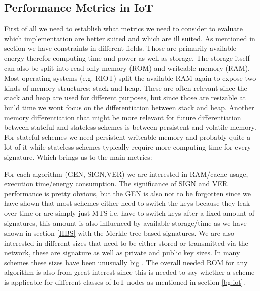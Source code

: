 \documentclass[conference]{IEEEtran}
\newcommand{\comment}[1]{}
\begin{document}
\subsection{Performance Metrics in IoT}
\comment{ %

'' small sized public key, small digital signature and a range of supported hash output sizes is recommended''\cite{QR_Iot_Lattice}

- „signature and/or key sizes to running times and memory consumption to energy consumption „
- „From the software benchmark perspec- tive, the runtime of key generation, signing, and verification processes whereas from the hardware perspective, CPU cycles, key size, signature size, and energy consumption are among the targeted evaluation metrics. In general, the parameter sets are highly dependent on the underlying construction of a particular scheme.“ \cite{QR_sigs}

} %

First of all we need to establish what metrics we need to consider to evaluate which implementation are better suited and which are ill suited.
As mentioned in section \label{bg:iot} we have constraints in different fields. Those are primarily available energy therefor computing time and power as well as storage.
The storage itself can also be split into read only memory (ROM) and writeable memory (RAM).
Most operating systems (e.g. RIOT) split the available RAM again to expose two kinds of memory structures: stack and heap. These are often relevant since the stack and heap are used for different purposes, but since those are resizable at build time we wont focus on the differentiation between stack and heap.
Another memory differentiation that might be more relevant for future differentiation between stateful and stateless schemes is between persistent and volatile memory. 
For stateful schemes we need persistent writeable memory and probably quite a lot of it while stateless schemes typically require more computing time for every signature. Which brings us to the main metrics:

For each algorithm (GEN, SIGN,VER) we are interested in RAM/cache usage, execution time/energy consumption.
The significance of SIGN and VER performance is pretty obvious, but the GEN is also not to be forgotten since we have shown that most schemes either need to switch the keys because they leak over time or are simply just MTS i.e. have to switch keys after a fixed amount of signatures, this amount is also influenced by available storage/time as we have shown in section \ref{HBS} with the Merkle tree based signatures.
We are also interested in different sizes that need to be either stored or transmitted via the network, these are signature as well as private and public key sizes. In many schemes these sizes have been unusually big \cite{QR_comparison}.
The overall needed ROM for any algorithm is also from great interest since this is needed to say whether a scheme is applicable for different classes of IoT nodes as mentioned in section \ref{bg:iot}.
\end{document}
